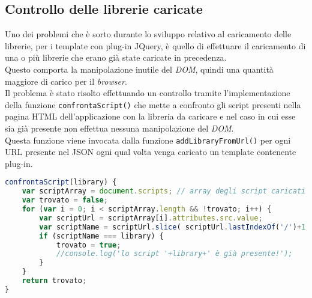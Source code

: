 \subsection{Controllo delle librerie caricate}
Uno dei problemi che è sorto durante lo sviluppo relativo al caricamento delle librerie, per i template con plug-in JQuery, è quello di effettuare il caricamento di una o più librerie che erano già state caricate in precedenza.\\
Questo comporta la manipolazione inutile del \textit{DOM}, quindi una quantità maggiore di carico per il \textit{browser}.\\
Il problema è stato risolto effettuando un controllo tramite l'implementazione della funzione \texttt{confrontaScript()} che mette a confronto gli script presenti nella pagina HTML dell'applicazione con la libreria da caricare e nel caso in cui esse sia già presente non effettua nessuna manipolazione del \textit{DOM}.\\
Questa funzione viene invocata dalla funzione \texttt{addLibraryFromUrl()} per ogni URL presente nel JSON ogni qual volta venga caricato un template contenente plug-in.
\begin{lstlisting}[language= JavaScript, caption= Funzione che gestisce il caricamento di una libreria.]
confrontaScript(library) {
	var scriptArray = document.scripts; // array degli script caricati
	var trovato = false;
	for (var i = 0; i < scriptArray.length && !trovato; i++) {
		var scriptUrl = scriptArray[i].attributes.src.value;
		var scriptName = scriptUrl.slice( scriptUrl.lastIndexOf('/')+1, scriptUrl.length);
		if (scriptName === library) {
			trovato = true;
			//console.log('lo script '+library+' è già presente!');
		}
	}
	return trovato;
}

\end{lstlisting}

